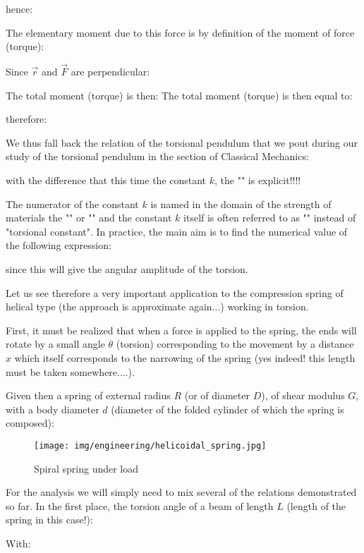 	hence:
	
	The elementary moment due to this force is by definition of the moment of force (torque):
	
	Since $\vec{r}$ and $\vec{F}$ are perpendicular:
	
	The total moment (torque) is then:
	The total moment (torque) is then equal to:
	
	therefore:
	
	We thus fall back the relation of the torsional pendulum that we pout during our study of the torsional pendulum in the section of Classical Mechanics:
	
	 with the difference that this time the constant $k$, the "" is explicit!!!!

	The numerator of the constant $k$ is named in the domain of the strength of materials the "" or "" and the constant $k$ itself is often referred to as "" instead of "torsional constant". In practice, the main aim is to find the numerical value of the following expression:
	
	since this will give the angular amplitude of the torsion.

	Let us see therefore a very important application to the compression spring of helical type (the approach is approximate again...) working in torsion.

	First, it must be realized that when a force is applied to the spring, the ends will rotate by a small angle $\theta$ (torsion) corresponding to the movement by a distance $x$ which itself corresponds to the narrowing of the spring (yes indeed! this length must be taken somewhere....).

	Given then a spring of external radius $R$ (or of diameter $D$), of shear modulus $G$, with a body diameter $d$ (diameter of the folded cylinder of which the spring is composed):
	\begin{figure}[H]
		\centering
		\texttt{[image: img/engineering/helicoidal\_spring.jpg]}
		\caption{Spiral spring under load}
	\end{figure}
	For the analysis we will simply need to mix several of the relations demonstrated so far. In the first place, the torsion angle of a beam of length $L$ (length of the spring in this case!):
	
	With:
	

